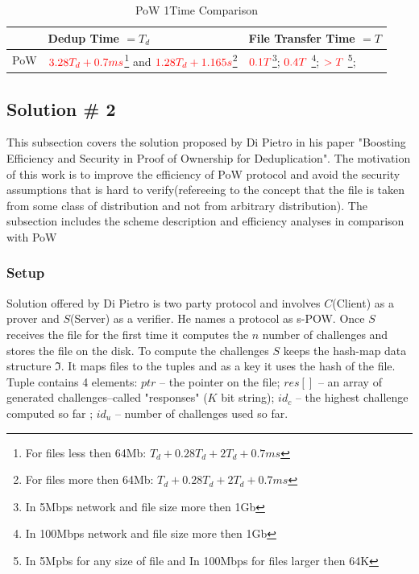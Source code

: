 \documentclass[12pt]{article}
\begin{document}
\begin{savenotes}
\begin{table}[!htpb]
\centering
\addtolength{\tabcolsep}{3pt}
\begin{tabular}{|L{1cm}|L{4.5cm}|L{4.5cm}|}
\hline
&Dedup Time  $= T_d$ &File Transfer Time $=T$ \\
\hline
PoW & $\color{red} 3.28T_d+0.7ms$\footnote{For files less then 64Mb: $T_d+0.28T_d+2T_d+0.7ms$}  and $\color{red} 1.28T_d+1.165s$\footnote{For files more then 64Mb: $T_d+0.28T_d+2T_d+0.7ms$ } 
& $\color{red} 0.1T$\footnote{In 5Mbps network and file size more then 1Gb}; $\color{red} 0.4T$ \footnote{In 100Mbps network and file size more then 1Gb}; 
$\color{red} > T$ \footnote{In 5Mpbs for any size of file and In 100Mbps for files larger then 64K}; \\
\hline

\end{tabular}
\caption{PoW 1Time Comparison}
\label{table:paramProbCodes}
\end{table}
\end{savenotes}



\subsection{Solution \# 2}
\label{sub:Soltuion2}

This subsection covers the solution proposed by Di Pietro\cite{DiPietro} in his paper "Boosting Efficiency and Security in Proof of Ownership for Deduplication". The motivation of this work is to improve the efficiency of PoW\cite{PoW} protocol and avoid the security  assumptions that is hard to verify(refereeing to the concept that the file is taken from some class of distribution and not from arbitrary distribution). The subsection includes the scheme description and efficiency analyses in comparison with PoW\cite{PoW} 

\subsubsection{Setup}
\label{subsub:setup2}


Solution offered by Di Pietro is two party protocol and involves $C$(Client) as a prover and $S$(Server) as a verifier. He names a protocol as s-POW. Once $S$ receives the file for the first time it computes the $n$ number of challenges and stores the file on the disk. To compute the challenges $S$ keeps the hash-map data structure $\Im$. It maps files to the tuples and as a key it uses the hash of the file. Tuple contains  4 elements: $ptr$ -- the pointer on the file; $res []$ -- an array of generated challenges--called "responses" ($K$ bit string); $id_c$ -- the highest challenge computed so far ; $id_u$ -- number of challenges used so far.
\end{document}
